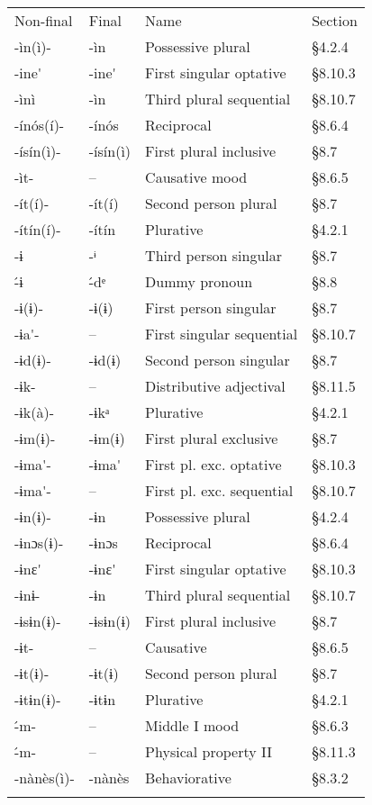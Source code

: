 \begin{table}
\begin{tabularx}{\textwidth}{XXXX}
\lsptoprule

Non-final & Final & Name & Section\\
{}-ìn(ì)- & {}-ìn & Possessive plural & §4.2.4\\
{}-ine\'{ } & {}-ine\'{ } & First singular optative & §8.10.3\\
{}-ìnì & {}-ìn & Third plural sequential & §8.10.7\\
{}-ínós(í)- & {}-ínós & Reciprocal & §8.6.4\\
{}-ísín(ì)- & {}-ísín(ì) & First plural inclusive & §8.7\\
{}-ìt- & – & Causative mood & §8.6.5\\
{}-ít(í)- & {}-ít(í) & Second person plural & §8.7\\
{}-ítín(í)- & {}-ítín & Plurative & §4.2.1\\
{}-ɨ & {}-ᶤ & Third person singular & §8.7\\
{}\'{-}ɨ & {}\'{-}dᵉ & Dummy pronoun & §8.8\\
{}-ɨ(ɨ)- & {}-ɨ(ɨ) & First person singular & §8.7\\
{}-ɨa\'{ }- & – & First singular sequential & §8.10.7\\
{}-ɨd(ɨ)- & {}-ɨd(ɨ) & Second person singular & §8.7\\
{}-ɨk- & – & Distributive adjectival & §8.11.5\\
{}-ɨk(à)- & {}-ɨkᵃ & Plurative & §4.2.1\\
{}-ɨm(ɨ)- & {}-ɨm(ɨ) & First plural exclusive & §8.7\\
{}-ɨma\'{ }- & {}-ɨma\'{ } & First pl. exc. optative & §8.10.3\\
{}-ɨma\'{ }- & – & First pl. exc. sequential & §8.10.7\\
{}-ɨn(ɨ)- & {}-ɨn & Possessive plural & §4.2.4\\
{}-ɨnɔs(ɨ)- & {}-ɨnɔs & Reciprocal & §8.6.4\\
{}-ɨnɛ\'{ } & {}-ɨnɛ\'{ } & First singular optative & §8.10.3\\
{}-ɨnɨ- & {}-ɨn & Third plural sequential & §8.10.7\\
{}-ɨsɨn(ɨ)- & {}-ɨsɨn(ɨ) & First plural inclusive & §8.7\\
{}-ɨt- & – & Causative & §8.6.5\\
{}-ɨt(ɨ)- & {}-ɨt(ɨ) & Second person plural & §8.7\\
{}-ɨtɨn(ɨ)- & {}-ɨtɨn & Plurative & §4.2.1\\
{}\'{-}m- & – & Middle I mood & §8.6.3\\
{}\'{-}m- & – & Physical property II & §8.11.3\\
{}-nànès(ì)- & {}-nànès & Behaviorative & §8.3.2\\
\lspbottomrule
\end{tabularx}


\end{table}
